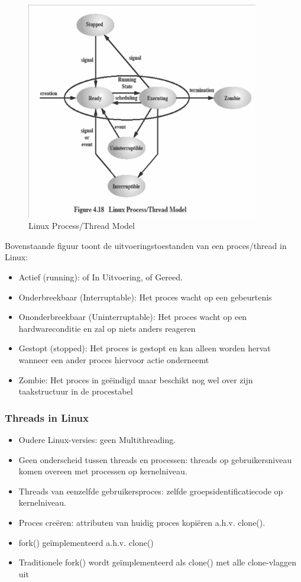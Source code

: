 \begin{figure}[htp]
    \centering
            \includegraphics[width=4in]{img/linuxprocessthreadmodel.png}
        \caption{Linux Process/Thread Model}
    \label{fig:Linux Process/Thread Model}
\end{figure}

Bovenstaande figuur toont de uitvoeringstoestanden van een proces/thread in Linux:

\begin{itemize}
\item Actief (running): of In Uitvoering, of Gereed.
\item Onderbreekbaar (Interruptable): Het proces wacht op een gebeurtenis
\item Ononderbreekbaar (Uninterruptable): Het proces wacht op een hardwareconditie en zal op niets anders reageren
\item Gestopt (stopped): Het proces is gestopt en kan alleen worden hervat wanneer een ander proces hiervoor actie onderneemt
\item Zombie: Het proces in geëindigd maar beschikt nog wel over zijn taakstructuur in de procestabel
\end{itemize}

\subsubsection{Threads in Linux}

\begin{itemize}
\item Oudere Linux-versies: geen Multithreading.
\item Geen onderscheid tussen threads en processen: threads op gebruikersniveau komen overeen met processen op kernelniveau.
\item Threads van eenzelfde gebruikersproces: zelfde groepsidentificatiecode op kernelniveau.
\item Proces creëren: attributen van huidig proces kopiëren a.h.v. clone().
\item fork() geïmplementeerd a.h.v. clone()
\item Traditionele fork() wordt geïmplementeerd als clone() met alle clone-vlaggen uit
\end{itemize}